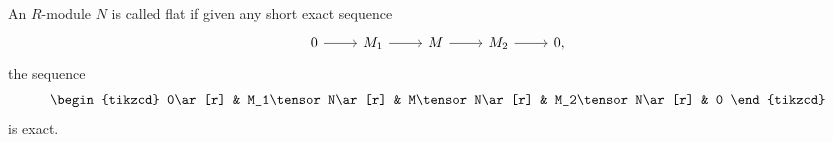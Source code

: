 An $R$-module $N$ is called flat if given any short exact sequence
\[\begin{tikzcd}
	0\ar[r] & M_1\ar[r] & M\ar[r] & M_2\ar[r] & 0,
\end{tikzcd}\]
the sequence
\[\begin{tikzcd}
	0\ar[r] & M_1\tensor N\ar[r] & M\tensor N\ar[r] & M_2\tensor N\ar[r] & 0
\end{tikzcd}\]
is exact.


